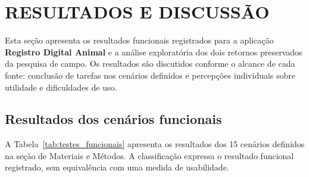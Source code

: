 \documentclass{UNESC}
\begin{document}
\section{RESULTADOS E DISCUSSÃO}

Esta seção apresenta os resultados funcionais registrados para a aplicação \textbf{Registro Digital Animal} e a análise exploratória dos dois retornos preservados da pesquisa de campo. Os resultados são discutidos conforme o alcance de cada fonte: conclusão de tarefas nos cenários definidos e percepções individuais sobre utilidade e dificuldades de uso.

\subsection{Resultados dos cenários funcionais}

A Tabela~\ref{tab:testes_funcionais} apresenta os resultados dos 15 cenários definidos na seção de Materiais e Métodos. A classificação expressa o resultado funcional registrado, sem equivalência com uma medida de usabilidade.
\end{document}

